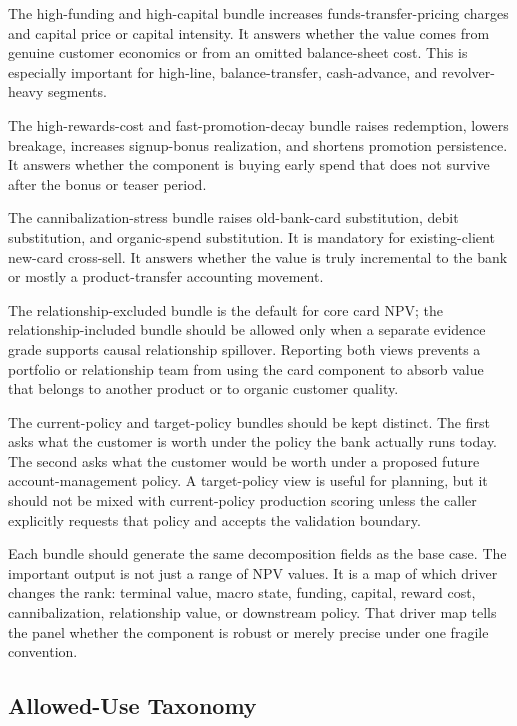 \documentclass[11pt]{article}
\newcommand{\1}{\mathbf{1}}
\begin{document}
The high-funding and high-capital bundle increases funds-transfer-pricing
charges and capital price or capital intensity. It answers whether the value
comes from genuine customer economics or from an omitted balance-sheet cost.
This is especially important for high-line, balance-transfer, cash-advance,
and revolver-heavy segments.

The high-rewards-cost and fast-promotion-decay bundle raises redemption,
lowers breakage, increases signup-bonus realization, and shortens promotion
persistence. It answers whether the component is buying early spend that does
not survive after the bonus or teaser period.

The cannibalization-stress bundle raises old-bank-card substitution, debit
substitution, and organic-spend substitution. It is mandatory for
existing-client new-card cross-sell. It answers whether the value is truly
incremental to the bank or mostly a product-transfer accounting movement.

The relationship-excluded bundle is the default for core card NPV; the
relationship-included bundle should be allowed only when a separate evidence
grade supports causal relationship spillover. Reporting both views prevents a
portfolio or relationship team from using the card component to absorb value
that belongs to another product or to organic customer quality.

The current-policy and target-policy bundles should be kept distinct. The
first asks what the customer is worth under the policy the bank actually runs
today. The second asks what the customer would be worth under a proposed
future account-management policy. A target-policy view is useful for planning,
but it should not be mixed with current-policy production scoring unless the
caller explicitly requests that policy and accepts the validation boundary.

Each bundle should generate the same decomposition fields as the base case.
The important output is not just a range of NPV values. It is a map of which
driver changes the rank: terminal value, macro state, funding, capital,
reward cost, cannibalization, relationship value, or downstream policy. That
driver map tells the panel whether the component is robust or merely precise
under one fragile convention.

\subsection{Allowed-Use Taxonomy}
\label{sec:allowed-use-taxonomy}
\end{document}
